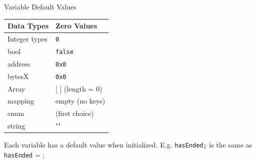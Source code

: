 \documentclass[handout]{beamer}
\begin{document}
\begin{frame}{Variable Default Values}

	\begin{table}
		\begin{tabular}{m{4cm} m{4cm}}
		\rowcolor{highlight}
			\hline
			Data Types & Zero Values\\
			\hline 
			\rowcolor{brightanthracite}
			Integer types & \texttt{0} \\
			bool &  \texttt{false} \\
			\rowcolor{brightanthracite}
			address & \texttt{0x0} \\
			bytesX & \texttt{0x0} \\
			\rowcolor{brightanthracite}
			Array & [ ] (length = 0) \\
			mapping & empty (no keys) \\
			\rowcolor{brightanthracite}
			enum & (first choice) \\
			string & "" \\
			\hline
		\end{tabular}
	\end{table}	
\vspace{1em}
Each variable has a default value when initialized. E.g. \texttt{hasEnded;} is the same as \texttt{hasEnded} = ;	
	
\end{frame}
\end{document}
